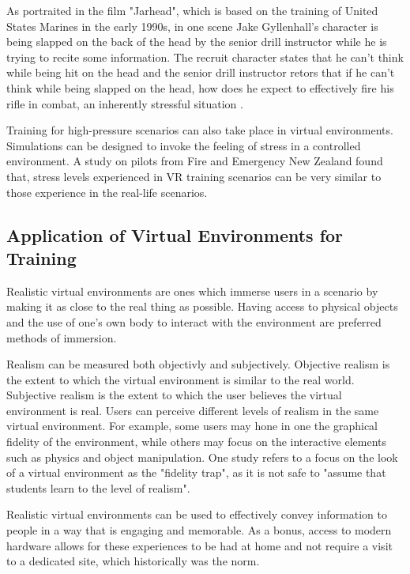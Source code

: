 \documentclass[12pt]{article}
\begin{document}
As portraited in the film "Jarhead", which is based on the training of United States Marines in the early 1990s, in one scene Jake Gyllenhall's character is being slapped on the back of the head by the senior drill instructor while he is trying to recite some information. The recruit character states that he can't think while being hit on the head and the senior drill instructor retors that if he can't think while being slapped on the head, how does he expect to effectively fire his rifle in combat, an inherently stressful situation \cite{jarhead2005}.

Training for high-pressure scenarios can also take place in virtual environments. Simulations can be designed to invoke the feeling of stress in a controlled environment. A study on pilots from Fire and Emergency New Zealand found that, stress levels experienced in VR training scenarios can be very similar to those experience in the real-life scenarios. \cite{clifford2019creating}

\subsection{Application of Virtual Environments for Training}

Realistic virtual environments are ones which immerse users in a scenario by making it as close to the real thing as possible. Having access to physical objects and the use of one's own body to interact with the environment are preferred methods of immersion. \cite{clifford2018effect}

Realism can be measured both objectivly and subjectively. \cite{gonccalves2022systematic} Objective realism is the extent to which the virtual environment is similar to the real world. Subjective realism is the extent to which the user believes the virtual environment is real. Users can perceive different levels of realism in the same virtual environment. For example, some users may hone in one the graphical fidelity of the environment, while others may focus on the interactive elements such as physics and object manipulation. One study refers to a focus on the look of a virtual environment as the "fidelity trap", as it is not safe to "assume that students learn to the level of realism". \cite{carey2020high}

Realistic virtual environments can be used to effectively convey information to people in a way that is engaging and memorable. As a bonus, access to modern hardware allows for these experiences to be had at home \cite{anderson2024blending} and not require a visit to a dedicated site, which historically was the norm. \cite{Scott2022}
\end{document}
